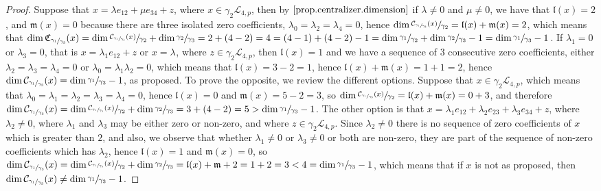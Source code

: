 \documentclass[12pt,fleqn]{article}
\begin{document}
\begin{proof}
Suppose that $x=\lambda e_{12}+\mu e_{34}+z$, where $x\in\gamma_2\mathcal{L}_{4,p}$, then by $\ref{prop.centralizer.dimension}$ if $\lambda\neq 0$ and $\mu\neq 0$, we have that $\mathfrak{l}(x)=2$, and $\mathfrak{m}(x)=0$ because there are three isolated zero coefficients, $\lambda_0=\lambda_2=\lambda_4=0$, hence $\dim\sfrac{\mathcal{C}_{\sfrac{\gamma_1}{\gamma_3}}(x)}{\gamma_2}=\mathfrak{l}(x)+\mathfrak{m}(x)=2$, which means that $\dim\mathfrak{C}_{\sfrac{\gamma_1}{\gamma_3}}(x)=\dim\sfrac{\mathcal{C}_{\sfrac{\gamma_1}{\gamma_3}}(x)}{\gamma_2}+\dim\sfrac{\gamma_2}{\gamma_3}=2+(4-2)=4=(4-1)+(4-2)-1=\dim\sfrac{\gamma_1}{\gamma_2}+\dim\sfrac{\gamma_2}{\gamma_3}-1=\dim\sfrac{\gamma_1}{\gamma_3}-1$. If $\lambda_1=0$ or $\lambda_3=0$, that is $x=\lambda_1 e_{12}+z$ or $x=\lambda_{}$, where $z\in\gamma_2\mathcal{L}_{4,p}$, then $\mathfrak{l}(x)=1$ and we have a sequence of $3$ consecutive zero coefficients, either $\lambda_2=\lambda_3=\lambda_4=0$ or $\lambda_0=\lambda_1\lambda_2=0$, which means that $\mathfrak{l}(x)=3-2=1$, hence $\mathfrak{l}(x)+\mathfrak{m}(x)=1+1=2$, hence $\dim\mathcal{C}_{\sfrac{\gamma_1}{\gamma_3}}(x)=\dim\sfrac{\gamma_1}{\gamma_3}-1$, as proposed. To prove the opposite, we review the different options. Suppose that $x\in\gamma_2\mathcal{L}_{4,p}$, which means that $\lambda_0=\lambda_1=\lambda_2=\lambda_3=\lambda_4=0$, hence $\mathfrak{l}(x)=0$ and $\mathfrak{m}(x)=5-2=3$, so $\dim\sfrac{\mathcal{C}_{\sfrac{\gamma_1}{\gamma_3}}(x)}{\gamma_2}=\mathfrak{l}(x)+\mathfrak{m}(x)=0+3$, and therefore $\dim\mathcal{C}_{\sfrac{\gamma_1}{\gamma_3}}(x)=\dim\sfrac{\mathcal{C}_{\sfrac{\gamma_1}{\gamma_3}}(x)}{\gamma_2}+\dim\sfrac{\gamma_2}{\gamma_3}=3+(4-2)=5>\dim\sfrac{\gamma_1}{\gamma_3}-1$. The other option is that $x=\lambda_1 e_{12}+\lambda_2 e_{23}+\lambda_3 e_{34}+z$, where $\lambda_2\neq 0$, where $\lambda_1$ and $\lambda_3$ may be either zero or non-zero, and where $z\in\gamma_2\mathcal{L}_{4,p}$. Since $\lambda_2\neq 0$ there is no sequence of zero coefficients of $x$ which is greater than $2$, and also, we observe that whether $\lambda_1\neq 0$ or $\lambda_3\neq 0$ or both are non-zero, they are part of the sequence of non-zero coefficients which has $\lambda_2$, hence $\mathfrak{l}(x)=1$ and $\mathfrak{m}(x)=0$, so $\dim\mathcal{C}_{\sfrac{\gamma_1}{\gamma_3}}(x)=\dim\sfrac{\mathcal{C}_{\sfrac{\gamma_1}{\gamma_3}}(x)}{\gamma_2}+\dim\sfrac{\gamma_2}{\gamma_3}=\mathfrak{l}(x)+\mathfrak{m}+2=1+2=3<4=\dim\sfrac{\gamma_1}{\gamma_3}-1$, which means that if $x$ is not as proposed, then $\dim\mathcal{C}_{\sfrac{\gamma_1}{\gamma_3}}(x)\neq\dim\sfrac{\gamma_1}{\gamma_3}-1$.
\end{proof}
\end{document}
